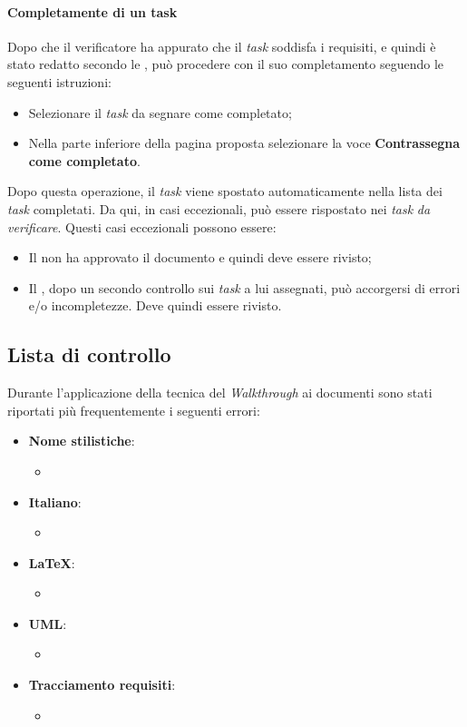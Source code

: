 \paragraph{Completamente di un task}
Dopo che il verificatore ha appurato che il \textit{task} soddisfa i requisiti, e quindi è stato redatto secondo le
\textit{\NdP}, può procedere con il suo completamento seguendo le seguenti istruzioni:
\begin{itemize}
  \item Selezionare il \textit{task} da segnare come completato;
  \item Nella parte inferiore della pagina proposta selezionare la voce \textbf{Contrassegna come completato}.
\end{itemize}
Dopo questa operazione, il \textit{task} viene spostato automaticamente nella lista dei \textit{task} completati. Da qui, in
casi eccezionali, può essere rispostato nei \textit{task} \textit{da verificare}. Questi casi eccezionali possono essere:
\begin{itemize}
  \item Il \textit{\RdP} non ha approvato il documento e quindi deve essere 
  rivisto;
  \item Il \textit{\Ver}, dopo un secondo controllo sui \textit{task} a lui assegnati, 
  può accorgersi di errori e/o incompletezze. Deve quindi essere rivisto.
\end{itemize}

\subsection{Lista di controllo}
Durante l'applicazione della tecnica del \textit{Walkthrough} ai documenti sono stati riportati 
più frequentemente i seguenti errori:
\begin{itemize}
  \item\textbf{Nome stilistiche}:
  \begin{itemize}
    \item
  \end{itemize}
  
  \item\textbf{Italiano}:
  \begin{itemize}
    \item
  \end{itemize}
  
  \item\textbf{\LaTeX}:
  \begin{itemize}
  \item
  \end{itemize}
  
  \item\textbf{UML}:
  \begin{itemize}
    \item
  \end{itemize}
  
  \item\textbf{Tracciamento requisiti}:
  \begin{itemize}
    \item
  \end{itemize}
\end{itemize}
